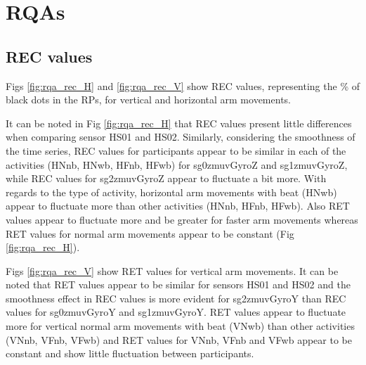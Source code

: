 \newpage
\section{RQAs} \label{appendix:e:rpas}
\subsection{REC values}
Figs \ref{fig:rqa_rec_H} and \ref{fig:rqa_rec_V} show REC values,
representing the \% of black dots in the RPs, for vertical and horizontal 
arm movements.

It can be noted in Fig \ref{fig:rqa_rec_H} that REC values present 
little differences when comparing sensor HS01 and HS02. 
Similarly, considering the smoothness of the time series, REC values for 
participants appear to be similar in each of the activities 
(HNnb, HNwb, HFnb, HFwb) for sg0zmuvGyroZ and sg1zmuvGyroZ, 
while REC values for sg2zmuvGyroZ appear to fluctuate a bit more.
With regards to the type of activity, horizontal arm movements with beat 
(HNwb) appear to fluctuate more than other activities (HNnb, HFnb, HFwb). 
Also RET values appear to fluctuate more and be greater for faster
arm movements whereas RET values for normal arm movements appear 
to be constant (Fig \ref{fig:rqa_rec_H}).

Figs \ref{fig:rqa_rec_V} show RET values for vertical arm movements.
It can be noted that RET values appear to be similar for sensors HS01 and HS02
and the smoothness effect in REC values is more evident for sg2zmuvGyroY 
than REC values for sg0zmuvGyroY and sg1zmuvGyroY.
RET values appear to fluctuate more for vertical normal arm movements with 
beat (VNwb) than other activities (VNnb, VFnb, VFwb) and  RET values for 
VNnb, VFnb and VFwb appear to be constant and show little fluctuation 
between participants.




